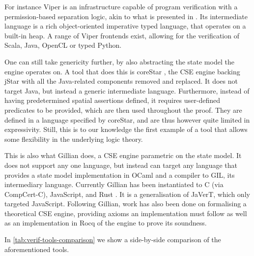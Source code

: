 For instance Viper \cite{viper} is an infrastructure capable of program verification with a permission-based separation logic, akin to what is presented in \cite{fracpermissions}. Its intermediate language is a rich object-oriented imperative typed language, that operates on a built-in heap. A range of Viper frontends exist, allowing for the verification of Scala, Java, OpenCL or typed Python.

One can still take genericity further, by also abstracting the state model the engine operates on. A tool that does this is coreStar \cite{corestar}, the CSE engine backing jStar with all the Java-related components removed and replaced. It does not target Java, but instead a generic intermediate language. Furthermore, instead of having predetermined spatial assertions defined, it requires user-defined predicates to be provided, which are then used throughout the proof. They are defined in a language specified by coreStar, and are thus however quite limited in expressivity. Still, this is to our knowledge the first example of a tool that allows some flexibility in the underlying logic theory.

This is also what Gillian \cite{gillian0, gillian1, gillian2, sacha-phd} does, a CSE engine parametric on the state model. It does not support any one language, but instead can target any language that provides a state model implementation in OCaml and a compiler to GIL, its intermediary language. Currently Gillian has been instantiated to C (via CompCert-C), JavaScript, and Rust \cite{gillianrust}. It is a generalisation of JaVerT, which only targeted JavaScript. Following Gillian, work has also been done on formalising a theoretical CSE engine, providing axioms an implementation must follow \cite{cse1,cse2} as well as an implementation in Rocq of the engine to prove its soundness.

In \autoref{tab:verif-tools-comparison} we show a side-by-side comparison of the aforementioned tools.

